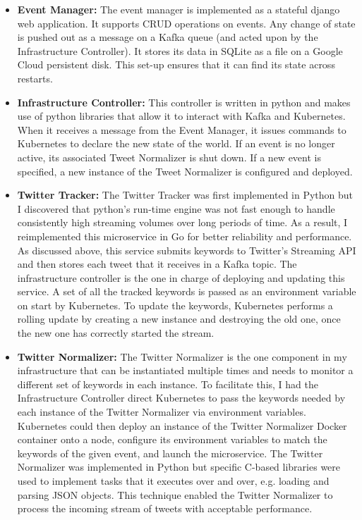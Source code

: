\begin{itemize}
	\item \textbf{Event Manager:} The event manager is implemented as a stateful django web application. It supports CRUD operations on events. Any change of state is pushed out as a message on a Kafka queue (and acted upon by the Infrastructure Controller). It stores its data in SQLite as a file on a Google Cloud persistent disk. This set-up ensures that it can find its state across restarts.

	\item \textbf{Infrastructure Controller:}  This controller is written in python and makes use of python libraries that allow it to interact with Kafka and Kubernetes. When it receives a message from the Event Manager, it issues commands to Kubernetes to declare the new state of the world. If an event is no longer active, its associated Tweet Normalizer is shut down. If a new event is specified, a new instance of the Tweet Normalizer is configured and deployed.

	\item \textbf{Twitter Tracker:} The Twitter Tracker was first implemented in Python but I discovered that python’s run-time engine was not fast enough to handle consistently high streaming volumes over long periods of time. As a result, I reimplemented this microservice in Go for better reliability and performance. As discussed above, this service submits keywords to Twitter’s Streaming API and then stores each tweet that it receives in a Kafka topic. The infrastructure controller is the one in charge of deploying and updating this service. A set of all the tracked keywords is passed as an environment variable on start by Kubernetes. To update the keywords, Kubernetes performs a rolling update by creating a new instance and destroying the old one, once the new one has correctly started the stream.

	\item \textbf{Twitter Normalizer:} The Twitter Normalizer is the one component in my infrastructure that can be instantiated multiple times and needs to monitor a different set of keywords in each instance. To facilitate this, I had the Infrastructure Controller direct Kubernetes to pass the keywords needed by each instance of the Twitter Normalizer via environment variables. Kubernetes could then deploy an instance of the Twitter Normalizer Docker container onto a node, configure its environment variables to match the keywords of the given event, and launch the microservice. The Twitter Normalizer was implemented in Python but specific C-based libraries were used to implement tasks that it executes over and over, e.g. loading and parsing JSON objects. This technique enabled the Twitter Normalizer to process the incoming stream of tweets with acceptable performance.
\end{itemize}

